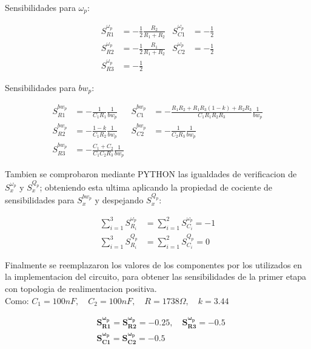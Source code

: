 Sensibilidades para $\omega_{p}$:

\begin{align*}
    S^{\omega_{p}}_{R1} &= - \frac{1}{2} \frac{R_{2}}{R_{1} + R_{2}}  &
    S^{\omega_{p}}_{C1} &= - \frac{1}{2} \\
    S^{\omega_{p}}_{R2} &= - \frac{1}{2} \frac{R_{1}}{R_{1} + R_{2}}  &
    S^{\omega_{p}}_{C2} &= - \frac{1}{2} \\
    S^{\omega_{p}}_{R3} &= - \frac{1}{2}
\end{align*}

Sensibilidades para $bw_{p}$:

\begin{align*}
    S^{bw_p}_{R1} &= - \frac{1}{C_{1} R_{1}} \frac{1}{bw_p}  &
    S^{bw_p}_{C1} &= - \frac{R_{1} R_{2} + R_{1} R_{3}  (1 - k) + R_{2} R_{3}}{C_{1} R_{1} R_{2} R_{3}} \frac{1}{bw_p} \\
    S^{bw_p}_{R2} &= - \frac{1-k}{C_{1} R_{2}} \frac{1}{bw_p}  &
    S^{bw_p}_{C2} &= - \frac{1}{C_{2} R_{3}} \frac{1}{bw_p} \\
    S^{bw_p}_{R3} &= - \frac{C_{1} + C_{2}}{C_{1} C_{2} R_{3}} \frac{1}{bw_p}
\end{align*}

Tambien se comprobaron mediante PYTHON las igualdades de verificacion de $S^{\omega_{p}}_{x}$ y $S^{Q_p}_{x}$; obteniendo esta ultima aplicando la propiedad de cociente de sensibilidades para $S^{bw_p}_{x}$ y despejando $S^{Q_p}_{x}$:

\begin{align*}
    \sum_{i=1}^{3} S^{\omega_p}_{R_i} &= \sum_{i=1}^{2} S^{\omega_p}_{C_i} = -1 \\
    \sum_{i=1}^{3} S^{Q_p}_{R_i} &= \sum_{i=1}^{2} S^{Q_p}_{C_i} = 0
\end{align*}

Finalmente se reemplazaron los valores de los componentes por los utilizados en la implementacion del circuito, para obtener las sensibilidades de la primer etapa con topologia de realimentacion positiva. \\

Como: $C_{1}=100 nF, \quad C_{2}=100 nF, \quad R=1738 \Omega, \quad k=3.44$ 
    
\begin{align}
    &\mathbf{S^{\omega_{p}}_{R1} = S^{\omega_{p}}_{R2} = -0.25, \quad S^{\omega_{p}}_{R3} = -0.5} \\
    &\mathbf{S^{\omega_{p}}_{C1} = S^{\omega_{p}}_{C2} = -0.5}
\end{align}

